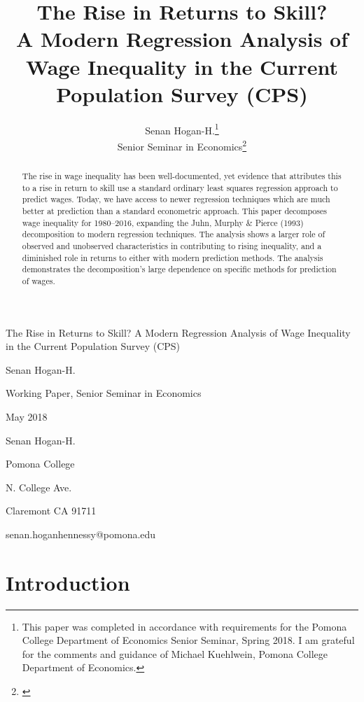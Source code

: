 \documentclass[notitlepage,12pt]{article}
\author{Senan Hogan-H.\footnote{This paper was completed in accordance with requirements for the Pomona College Department of Economics Senior Seminar, Spring 2018.  I am grateful for the comments and guidance of Michael Kuehlwein, Pomona College Department of Economics.} \\ Senior Seminar in Economics\footnote{\href{https://github.com/shoganhennessy/ECON190}{\color{blue}{\underline{This project's Github repository, which hosts all contributing materials, is available here.}}}}}
\title{The Rise in Returns to Skill? \\ \Large{A Modern Regression Analysis of Wage Inequality in the Current Population Survey (CPS)}}
\date{\begin{singlespace} \normalsize{
\vfill Pomona College, Department of Economics \\
\noindent 425 N. College Ave.  \\
\noindent Claremont CA 91711   \\
\noindent May 2018}
\end{singlespace}}
\begin{document}
\maketitle
\thispagestyle{empty}

\newpage \thispagestyle{empty}
\begin{singlespace}
\noindent The Rise in Returns to Skill?  A Modern Regression Analysis of Wage Inequality in the Current Population Survey (CPS)

\noindent Senan Hogan-H.

\noindent Working Paper, Senior Seminar in Economics

\noindent May 2018
\end{singlespace}

\begin{abstract} \noindent
The rise in wage inequality has been well-documented, yet evidence that attributes this to a rise in return to skill use a standard ordinary least squares regression approach to predict wages.  Today, we have access to newer regression techniques which are much better at prediction than a standard econometric approach.  This paper decomposes wage inequality for 1980--2016, expanding the Juhn, Murphy \& Pierce (1993) decomposition to modern regression techniques.  The analysis shows a larger role of observed and unobserved characteristics in contributing to rising inequality, and a diminished role in returns to either with modern prediction methods.  The analysis demonstrates the decomposition's large dependence on specific methods for prediction of wages.
\end{abstract}
\vfill
\begin{singlespace}
\noindent Senan Hogan-H.

\noindent Pomona College

 N. College Ave.

\noindent Claremont CA 91711

\noindent senan.hoganhennessy@pomona.edu
\end{singlespace}


\newpage
\setcounter{page}{1}

\section{Introduction}
\end{document}
